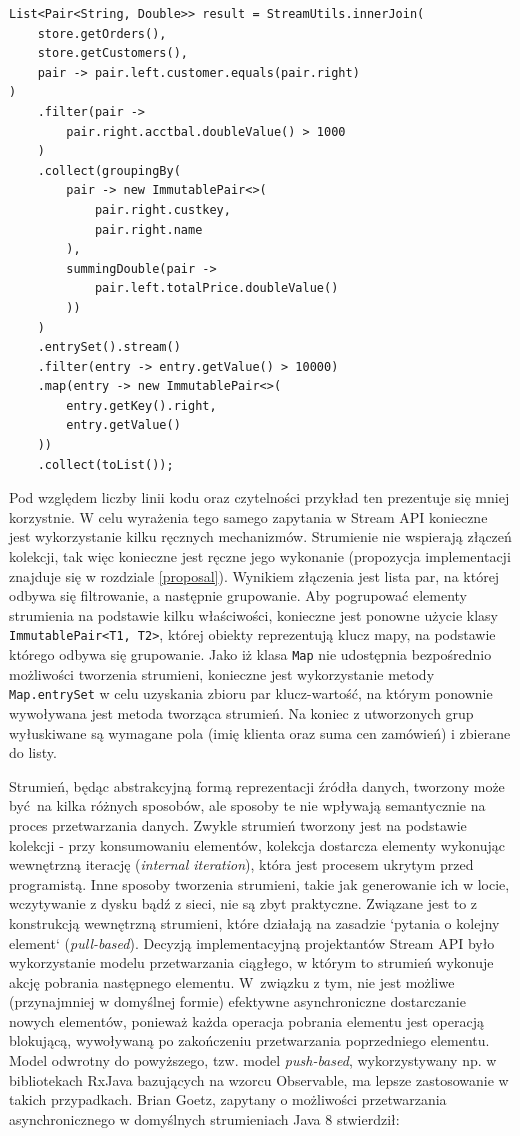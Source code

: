 \documentclass[12pt,twoside,openright]{extarticle}
\begin{document}
\begin{lstlisting}[label=streamsexample, caption=Analogiczne rozwiązanie wykorzystujące Stream API]
List<Pair<String, Double>> result = StreamUtils.innerJoin(
    store.getOrders(),
    store.getCustomers(),
    pair -> pair.left.customer.equals(pair.right)
)
    .filter(pair ->
        pair.right.acctbal.doubleValue() > 1000
    )
    .collect(groupingBy(
        pair -> new ImmutablePair<>(
            pair.right.custkey,
            pair.right.name
        ),
        summingDouble(pair ->
            pair.left.totalPrice.doubleValue()
        ))
    )
    .entrySet().stream()
    .filter(entry -> entry.getValue() > 10000)
    .map(entry -> new ImmutablePair<>(
        entry.getKey().right,
        entry.getValue()
    ))
    .collect(toList());
\end{lstlisting}

    Pod względem liczby linii kodu oraz czytelności przykład ten prezentuje się mniej korzystnie. W celu wyrażenia tego samego zapytania w Stream API konieczne jest wykorzystanie kilku ręcznych mechanizmów. Strumienie nie wspierają złączeń kolekcji, tak więc konieczne jest ręczne jego wykonanie (propozycja implementacji znajduje się w rozdziale \ref{proposal}). Wynikiem złączenia jest lista par, na której odbywa się filtrowanie, a następnie grupowanie. Aby pogrupować elementy strumienia na podstawie kilku właściwości, konieczne jest ponowne użycie klasy \texttt{ImmutablePair<T1, T2>}, której obiekty reprezentują klucz mapy, na podstawie którego odbywa się grupowanie. Jako iż klasa \texttt{Map} nie udostępnia bezpośrednio możliwości tworzenia strumieni, konieczne jest wykorzystanie metody \texttt{Map.entrySet} w celu uzyskania zbioru par klucz-wartość, na którym ponownie wywoływana jest metoda tworząca strumień. Na koniec z utworzonych grup wyłuskiwane są wymagane pola (imię klienta oraz suma cen zamówień) i zbierane do listy.

    Strumień, będąc abstrakcyjną formą reprezentacji źródła danych, tworzony może być na kilka różnych sposobów, ale sposoby te nie wpływają semantycznie na proces przetwarzania danych. Zwykle strumień tworzony jest na podstawie kolekcji - przy konsumowaniu elementów, kolekcja dostarcza elementy wykonując wewnętrzną iterację (\textit{internal iteration}), która jest procesem ukrytym przed programistą. Inne sposoby tworzenia strumieni, takie jak generowanie ich w locie, wczytywanie z dysku bądź z sieci, nie są zbyt praktyczne. Związane jest to z konstrukcją wewnętrzną strumieni, które działają na zasadzie `pytania o kolejny element` (\textit{pull-based}). Decyzją implementacyjną projektantów Stream API było wykorzystanie modelu przetwarzania ciągłego, w którym to strumień wykonuje akcję pobrania następnego elementu. W~związku z tym, nie jest możliwe (przynajmniej w domyślnej formie) efektywne asynchroniczne dostarczanie nowych elementów, ponieważ każda operacja pobrania elementu jest operacją blokującą, wywoływaną po zakończeniu przetwarzania poprzedniego elementu. Model odwrotny do powyższego, tzw. model \textit{push-based}, wykorzystywany np. w bibliotekach RxJava bazujących na wzorcu Observable, ma lepsze zastosowanie w takich przypadkach. Brian Goetz, zapytany o możliwości przetwarzania asynchronicznego w domyślnych strumieniach Java 8 stwierdził:
\end{document}
